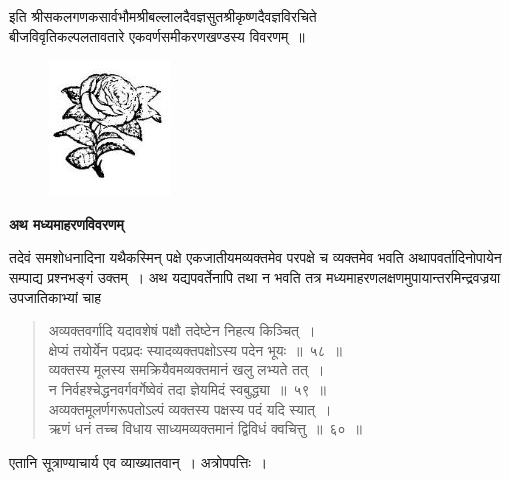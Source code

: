 \documentclass[11pt, openany]{book}
\begin{document}
\begin{center}
इति श्रीसकलगणकसार्वभौमश्रीबल्लालदैवज्ञसुतश्रीकृष्णदैवज्ञविरचिते \\
बीजविवृतिकल्पलतावतारे एकवर्णसमीकरणखण्डस्य विवरणम्~॥ 
\end{center}

\vspace{8mm}
\begin{figure}[h!]
    \centering
    \includegraphics[scale=0.8]{Graphics/Capture1.JPG}
\end{figure}
\newpage

 \label{madhyama}
\begin{center}
    \textbf{\LARGE अथ मध्यमाहरणविवरणम् }
\end{center}
 
  \vspace{2mm}
 तदेवं समशोधनादिना यथैकस्मिन् पक्षे एकजातीयमव्यक्तमेव परपक्षे च 
व्यक्तमेव भवति अथापवर्तादिनोपायेन सम्पाद्य प्रश्नभङ्गं उक्तम्~। अथ 
यद्यपवर्तेनापि तथा न भवति तत्र मध्यमाहरणलक्षणमुपायान्तरमिन्द्रवज्रया 
उपजातिकाभ्यां चाह\textendash 
\begin{quote}
    \bs
 अव्यक्तवर्गादि यदावशेषं पक्षौ तदेष्टेन निहत्य किञ्चित्~। \\
 क्षेप्यं तयोर्येन पदप्रदः स्यादव्यक्तपक्षोऽस्य पदेन भूयः~॥~५८~॥\\ 

 \vspace{-5mm}
 व्यक्तस्य मूलस्य समक्रियैवमव्यक्तमानं खलु लभ्यते तत्~। \\
 न निर्वहश्चेद्धनवर्गवर्गेष्वेवं तदा ज्ञेयमिदं स्वबुद्ध्या~॥~५९~॥\\

\vspace{-5mm}
 अव्यक्तमूलर्णगरूपतोऽल्पं व्यक्तस्य पक्षस्य पदं यदि स्यात्~। \\
 ऋणं धनं तच्च विधाय साध्यमव्यक्तमानं द्विविधं क्वचित्तु~॥~६०~॥~
\end{quote}

एतानि सूत्राण्याचार्य एव व्याख्यातवान्~। अत्रोपपत्तिः~। \\
\end{document}
